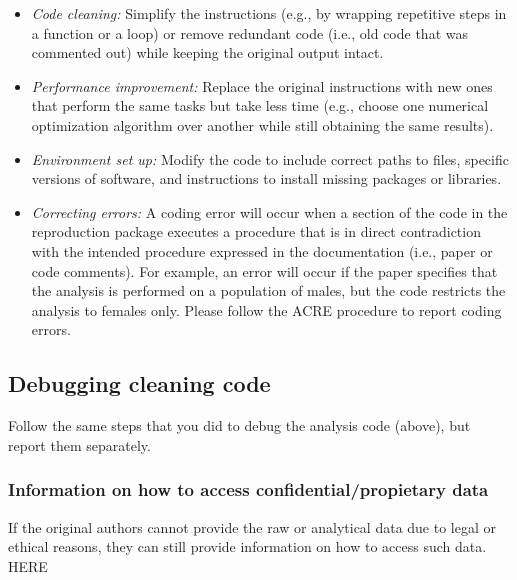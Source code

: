 \documentclass[
]{book}
\providecommand{\tightlist}{%
  \setlength{\itemsep}{0pt}\setlength{\parskip}{0pt}}
\begin{document}
\begin{itemize}
\tightlist
\item
  \emph{Code cleaning:} Simplify the instructions (e.g., by wrapping repetitive steps in a function or a loop) or remove redundant code (i.e., old code that was commented out) while keeping the original output intact.\\
\item
  \emph{Performance improvement:} Replace the original instructions with new ones that perform the same tasks but take less time (e.g., choose one numerical optimization algorithm over another while still obtaining the same results).\\
\item
  \emph{Environment set up:} Modify the code to include correct paths to files, specific versions of software, and instructions to install missing packages or libraries.\\
\item
  \emph{Correcting errors:} A coding error will occur when a section of the code in the reproduction package executes a procedure that is in direct contradiction with the intended procedure expressed in the documentation (i.e., paper or code comments). For example, an error will occur if the paper specifies that the analysis is performed on a population of males, but the code restricts the analysis to females only. Please follow the ACRE procedure to report coding errors.
\end{itemize}

\hypertarget{debugging-cleaning-code}{%
\subsection{Debugging cleaning code}\label{debugging-cleaning-code}}

Follow the same steps that you did to debug the analysis code (above), but report them separately.

\hypertarget{information-on-how-to-access-confidentialpropietary-data}{%
\subsubsection{Information on how to access confidential/propietary data}\label{information-on-how-to-access-confidentialpropietary-data}}

If the original authors cannot provide the raw or analytical data due to legal or ethical reasons, they can still provide information on how to access such data.
HERE
\end{document}
